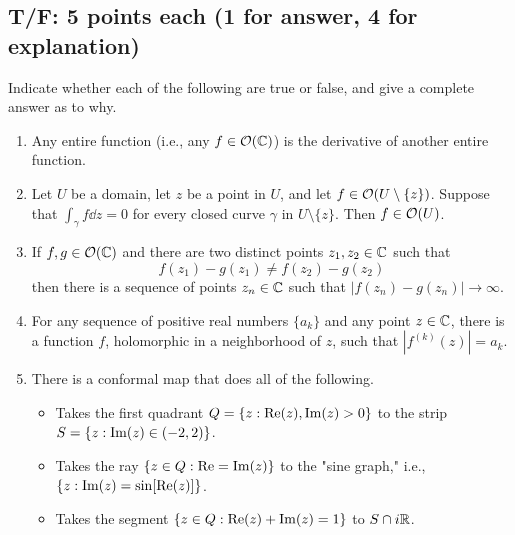 \documentclass[../notes.tex]{subfiles}
\begin{document}
\subsection*{T/F: 5 points each (1 for answer, 4 for explanation)}
Indicate whether each of the following are true or false, and give a complete answer as to why.
\begin{enumerate}
    \item Any entire function (i.e., any $f\in\mathcal{O}(\mathbb{C})$) is the derivative of another entire function.
    \item Let $U$ be a domain, let $z$ be a point in $U$, and let $f\in\mathcal{O}(U\setminus\{z\})$. Suppose that $\int_\gamma f\dd{z}=0$ for every closed curve $\gamma$ in $U\setminus\{z\}$. Then $f\in\mathcal{O}(U)$.
    \item If $f,g\in\mathcal{O}(\mathbb{C})$ and there are two distinct points $z_1,z_2\in\mathbb{C}$ such that
    \begin{equation*}
        f(z_1)-g(z_1) \neq f(z_2)-g(z_2)
    \end{equation*}
    then there is a sequence of points $z_n\in\mathbb{C}$ such that $|f(z_n)-g(z_n)|\to\infty$.
    \item For any sequence of positive real numbers $\{a_k\}$ and any point $z\in\mathbb{C}$, there is a function $f$, holomorphic in a neighborhood of $z$, such that $|f^{(k)}(z)|=a_k$.
    \item There is a conformal map that does all of the following.
    \begin{itemize}
        \item Takes the first quadrant $Q=\{z:\operatorname{Re}(z),\operatorname{Im}(z)>0\}$ to the strip $S=\{z:\operatorname{Im}(z)\in(-2,2)\}$.
        \item Takes the ray $\{z\in Q:\operatorname{Re}=\operatorname{Im}(z)\}$ to the "sine graph," i.e., $\{z:\operatorname{Im}(z)=\sin[\operatorname{Re}(z)]\}$.
        \item Takes the segment $\{z\in Q:\operatorname{Re}(z)+\operatorname{Im}(z)=1\}$ to $S\cap i\mathbb{R}$.
    \end{itemize}
\end{enumerate}
\end{document}
